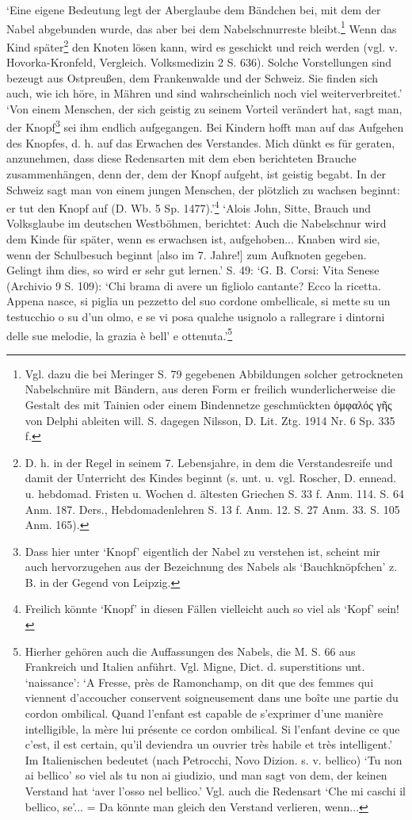 \documentclass[a4paper, 11pt, oneside]{article}
\begin{document}
`Eine eigene Bedeutung legt der Aberglaube dem Bändchen bei, mit dem der Nabel abgebunden wurde, das aber bei dem Nabelschnurreste bleibt.\footnote{Vgl. dazu die bei Meringer S. 79 gegebenen Abbildungen solcher getrockneten Nabelschnüre mit Bändern, aus deren Form er freilich wunderlicherweise die Gestalt des mit Tainien oder einem Bindennetze geschmückten ὀμφαλός γῆς von Delphi ableiten will. S. dagegen Nilsson, D. Lit. Ztg. 1914 Nr. 6 Sp. 335 f.} Wenn das Kind später\footnote{D. h. in der Regel in seinem 7. Lebensjahre, in dem die Verstandesreife und damit der Unterricht des Kindes beginnt (s. unt. u. vgl. Roscher, D. ennead. u. hebdomad. Fristen u. Wochen d. ältesten Griechen S. 33 f. Anm. 114. S. 64 Anm. 187. Ders., Hebdomadenlehren S. 13 f. Anm. 12. S. 27 Anm. 33. S. 105 Anm. 165).} den Knoten lösen kann, wird es geschickt und reich werden (vgl. v. Hovorka-Kronfeld, Vergleich. Volksmedizin 2 S. 636). Solche Vorstellungen sind bezeugt aus Ostpreußen, dem Frankenwalde und der Schweiz. Sie finden sich auch, wie ich höre, in Mähren und sind wahrscheinlich noch viel weiterverbreitet.' `Von einem Menschen, der sich geistig zu seinem Vorteil verändert hat, sagt man, der Knopf\footnote{Dass hier unter `Knopf' eigentlich der Nabel zu verstehen ist, scheint mir auch hervorzugehen aus der Bezeichnung des Nabels als `Bauchknöpfchen' z. B. in der Gegend von Leipzig.} sei ihm endlich aufgegangen. Bei Kindern hofft man auf das Aufgehen des Knopfes, d. h. auf das Erwachen des Verstandes. Mich dünkt es für geraten, anzunehmen, dass diese Redensarten mit dem eben berichteten Brauche zusammenhängen, denn der, dem der Knopf aufgeht, ist geistig begabt. In der Schweiz sagt man von einem jungen Menschen, der plötzlich zu wachsen beginnt: er tut den Knopf auf (D. Wb. 5 Sp. 1477).'\footnote{Freilich könnte `Knopf' in diesen Fällen vielleicht auch so viel als `Kopf' sein!} `Alois John, Sitte, Brauch und Volksglaube im deutschen Westböhmen, berichtet: Auch die Nabelschnur wird dem Kinde für später, wenn es erwachsen ist, aufgehoben... Knaben wird sie, wenn der Schulbesuch beginnt [also im 7. Jahre!] zum Aufknoten gegeben. Gelingt ihm dies, so wird er sehr gut lernen.' S. 49: `G. B. Corsi: Vita Senese (Archivio 9 S. 109): `Chi brama di avere un figliolo cantante? Ecco la ricetta. Appena nasce, si piglia un pezzetto del suo cordone ombellicale, si mette su un testucchio o su d'un olmo, e se vi posa qualche usignolo a rallegrare i dintorni delle sue melodie, la grazia è bell' e ottenuta.'\footnote{Hierher gehören auch die Auffassungen des Nabels, die M. S. 66 aus Frankreich und Italien anführt. Vgl. Migne, Dict. d. superstitions unt. `naissance': `A Fresse, près de Ramonchamp, on dit que des femmes qui viennent d'accoucher conservent soigneusement dans une boîte une partie du cordon ombilical. Quand l'enfant est capable de s'exprimer d'une manière intelligible, la mère lui présente ce cordon ombilical. Si l'enfant devine ce que c'est, il est certain, qu'il deviendra un ouvrier très habile et très intelligent.' Im Italienischen bedeutet (nach Petrocchi, Novo Dizion. s. v. bellico) `Tu non ai bellico' so viel als tu non ai giudizio, und man sagt von dem, der keinen Verstand hat `aver l'osso nel bellico.' Vgl. auch die Redensart `Che mi caschi il bellico, se'... = Da könnte man gleich den Verstand verlieren, wenn...}
\end{document}
